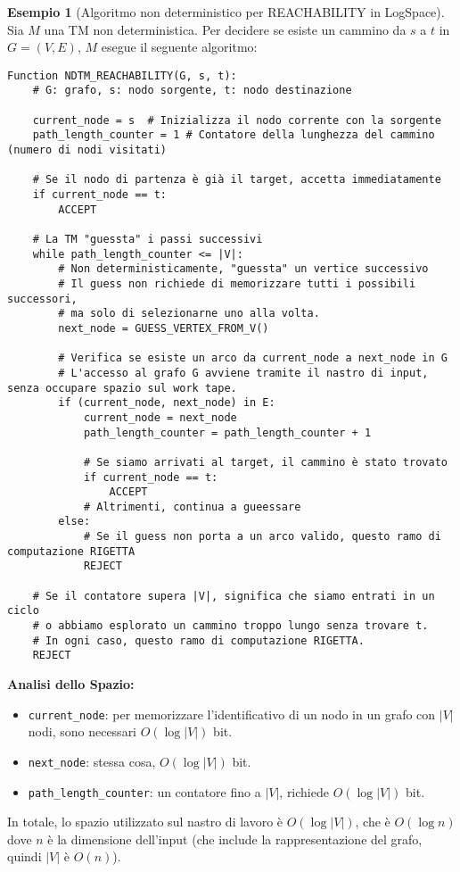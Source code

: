\documentclass[a4paper]{article}
\theoremstyle{definition} %
\newtheorem{example}{Esempio}[section]
\begin{document}
\begin{example}[Algoritmo non deterministico per REACHABILITY in LogSpace]
Sia $M$ una TM non deterministica. Per decidere se esiste un cammino da $s$ a $t$ in $G=(V,E)$, $M$ esegue il seguente algoritmo:

\begin{verbatim}
Function NDTM_REACHABILITY(G, s, t):
    # G: grafo, s: nodo sorgente, t: nodo destinazione
    
    current_node = s  # Inizializza il nodo corrente con la sorgente
    path_length_counter = 1 # Contatore della lunghezza del cammino (numero di nodi visitati)
    
    # Se il nodo di partenza è già il target, accetta immediatamente
    if current_node == t:
        ACCEPT
        
    # La TM "guessta" i passi successivi
    while path_length_counter <= |V|:
        # Non deterministicamente, "guessta" un vertice successivo
        # Il guess non richiede di memorizzare tutti i possibili successori,
        # ma solo di selezionarne uno alla volta.
        next_node = GUESS_VERTEX_FROM_V() 
        
        # Verifica se esiste un arco da current_node a next_node in G
        # L'accesso al grafo G avviene tramite il nastro di input, senza occupare spazio sul work tape.
        if (current_node, next_node) in E:
            current_node = next_node
            path_length_counter = path_length_counter + 1
            
            # Se siamo arrivati al target, il cammino è stato trovato
            if current_node == t:
                ACCEPT
            # Altrimenti, continua a gueessare
        else:
            # Se il guess non porta a un arco valido, questo ramo di computazione RIGETTA
            REJECT
    
    # Se il contatore supera |V|, significa che siamo entrati in un ciclo
    # o abbiamo esplorato un cammino troppo lungo senza trovare t.
    # In ogni caso, questo ramo di computazione RIGETTA.
    REJECT
\end{verbatim}

\textbf{Analisi dello Spazio:}
\begin{itemize}
    \item \texttt{current\_node}: per memorizzare l'identificativo di un nodo in un grafo con $|V|$ nodi, sono necessari $O(\log |V|)$ bit.
    \item \texttt{next\_node}: stessa cosa, $O(\log |V|)$ bit.
    \item \texttt{path\_length\_counter}: un contatore fino a $|V|$, richiede $O(\log |V|)$ bit.
\end{itemize}
In totale, lo spazio utilizzato sul nastro di lavoro è $O(\log |V|)$, che è $O(\log n)$ dove $n$ è la dimensione dell'input (che include la rappresentazione del grafo, quindi $|V|$ è $O(n)$).


\end{example}
\end{document}
